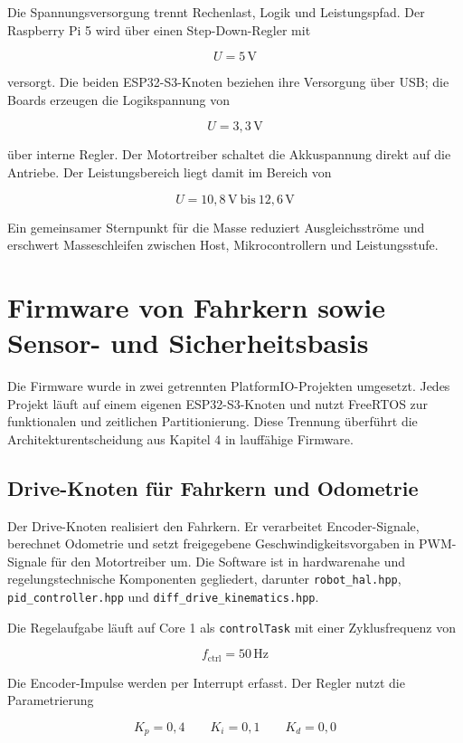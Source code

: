 Die Spannungsversorgung trennt Rechenlast, Logik und Leistungspfad. Der Raspberry Pi 5 wird über einen Step-Down-Regler mit

$$U = 5\,\mathrm{V}$$

versorgt. Die beiden ESP32-S3-Knoten beziehen ihre Versorgung über USB; die Boards erzeugen die Logikspannung von

$$U = 3{,}3\,\mathrm{V}$$

über interne Regler. Der Motortreiber schaltet die Akkuspannung direkt auf die Antriebe. Der Leistungsbereich liegt damit im Bereich von

$$U = 10{,}8\,\mathrm{V}\ \text{bis}\ 12{,}6\,\mathrm{V}$$

Ein gemeinsamer Sternpunkt für die Masse reduziert Ausgleichsströme und erschwert Masseschleifen zwischen Host, Mikrocontrollern und Leistungsstufe.

\section{Firmware von Fahrkern sowie Sensor- und Sicherheitsbasis}

Die Firmware wurde in zwei getrennten PlatformIO-Projekten umgesetzt. Jedes Projekt läuft auf einem eigenen ESP32-S3-Knoten und nutzt FreeRTOS zur funktionalen und zeitlichen Partitionierung. Diese Trennung überführt die Architekturentscheidung aus Kapitel 4 in lauffähige Firmware.

\subsection{Drive-Knoten für Fahrkern und Odometrie}

Der Drive-Knoten realisiert den Fahrkern. Er verarbeitet Encoder-Signale, berechnet Odometrie und setzt freigegebene Geschwindigkeitsvorgaben in PWM-Signale für den Motortreiber um. Die Software ist in hardwarenahe und regelungstechnische Komponenten gegliedert, darunter \texttt{robot\_hal.hpp}, \texttt{pid\_controller.hpp} und \texttt{diff\_drive\_kinematics.hpp}.

Die Regelaufgabe läuft auf Core 1 als \texttt{controlTask} mit einer Zyklusfrequenz von

$$f_{\mathrm{ctrl}} = 50\,\mathrm{Hz}$$

Die Encoder-Impulse werden per Interrupt erfasst. Der Regler nutzt die Parametrierung

$$K_p = 0{,}4 \qquad K_i = 0{,}1 \qquad K_d = 0{,}0$$

